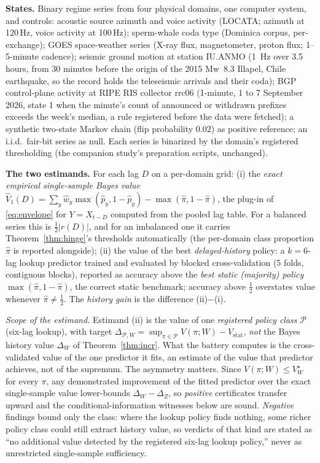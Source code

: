 \documentclass[acmsmall,screen,review,anonymous]{acmart}
\begin{document}
\textbf{States.} Binary regime series from four physical domains, one
computer system, and controls: acoustic source azimuth and voice activity (LOCATA; azimuth at 120\,Hz, voice activity at 100\,Hz);
sperm-whale coda type (Dominica corpus, per-exchange); GOES space-weather
series (X-ray flux, magnetometer, proton flux; 1--5-minute cadence); seismic
ground motion at station IU.ANMO (1~Hz over 3.5 hours, from 30 minutes
before the origin of the 2015 Mw~8.3 Illapel, Chile earthquake, so the
record holds the teleseismic arrivals and their coda); BGP control-plane
activity at RIPE RIS collector rrc06 (1-minute, 1 to 7 September 2026,
state 1 when the minute's count of announced or withdrawn prefixes exceeds
the week's median, a rule registered before the data were fetched); a synthetic two-state Markov chain
(flip probability $0.02$) as positive reference; an i.i.d.\ fair-bit series
as null. Each series is binarized by the domain's registered thresholding
(the companion study's preparation scripts, unchanged).

\textbf{The two estimands.} For each lag $D$ on a per-domain grid:
(i) the \emph{exact empirical single-sample Bayes value}
$\widehat V_1(D)=\sum_y \hat w_y \max(\hat p_y, 1-\hat p_y)
-\max(\hat\pi,1-\hat\pi)$, the plug-in of \eqref{eq:envelope} for
$Y=X_{t-D}$ computed from the pooled lag table. For a balanced series
this is $\tfrac12|r(D)|$, and for an imbalanced one it carries
Theorem~\ref{thm:hinge}'s thresholds automatically (the per-domain class
proportion $\hat\pi$ is reported alongside); (ii) the value of the best
\emph{delayed-history} policy: a $k{=}6$-lag lookup predictor trained and
evaluated by blocked cross-validation (5 folds, contiguous blocks),
reported as accuracy above the \emph{best static (majority) policy}
$\max(\hat\pi,1-\hat\pi)$, the correct static benchmark; accuracy above
$\tfrac12$ overstates value whenever $\hat\pi\neq\tfrac12$. The
\emph{history gain} is the difference (ii)$-$(i).

\emph{Scope of the estimand.} Estimand (ii) is the value of one
\emph{registered policy class} $\mathcal P$ (six-lag lookup), with target
$\Delta_{\mathcal P,W}=\sup_{\pi\in\mathcal P}V(\pi;W)
-V_{\mathrm{stat}}$, \emph{not} the Bayes history value $\Delta_W$ of
Theorem~\ref{thm:incr}. What the battery computes is the cross-validated
value of the one predictor it fits, an estimate of the value that
predictor achieves, not of the supremum. The asymmetry matters. Since
$V(\pi;W)\le V^\star_W$ for every $\pi$, any demonstrated improvement of
the fitted predictor over the exact single-sample value lower-bounds
$\Delta_W-\Delta_Z$, so
\emph{positive} certificates transfer upward and the conditional-information
witnesses below are sound. \emph{Negative} findings bound only the class:
where the lookup policy finds nothing, some richer policy class could still
extract history value, so verdicts of that kind are stated as ``no
additional value detected by the registered six-lag lookup policy,'' never
as unrestricted single-sample sufficiency.
\end{document}
